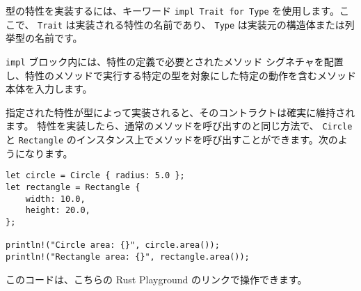 型の特性を実装するには、キーワード \texttt{impl Trait for Type} を使用します。ここで、 \texttt{Trait} は実装される特性の名前であり、 \texttt{Type} は実装元の構造体または列挙型の名前です。

\texttt{impl} ブロック内には、特性の定義で必要とされたメソッド シグネチャを配置し、特性のメソッドで実行する特定の型を対象にした特定の動作を含むメソッド本体を入力します。

指定された特性が型によって実装されると、そのコントラクトは確実に維持されます。 特性を実装したら、通常のメソッドを呼び出すのと同じ方法で、 \texttt{Circle} と \texttt{Rectangle} のインスタンス上でメソッドを呼び出すことができます。次のようになります。

\begin{lstlisting}[numbers=none]
let circle = Circle { radius: 5.0 };
let rectangle = Rectangle {
    width: 10.0,
    height: 20.0,
};

println!("Circle area: {}", circle.area());
println!("Rectangle area: {}", rectangle.area());
\end{lstlisting}

このコードは、こちらの Rust Playground のリンクで操作できます。

